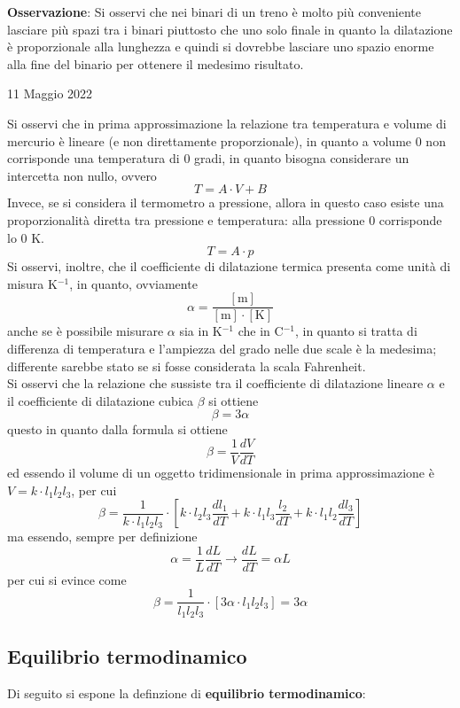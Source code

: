 \documentclass[a4paper]{extarticle}
\begin{document}
\vspace{1em}
\noindent
\textbf{Osservazione}: Si osservi che nei binari di un treno è molto più conveniente lasciare più spazi tra i binari piuttosto che uno solo finale in quanto la dilatazione è proporzionale alla lunghezza e quindi si dovrebbe lasciare uno spazio enorme alla fine del binario per ottenere il medesimo risultato.

\newpage
\noindent
\begin{center}
  11 Maggio 2022
\end{center}
Si osservi che in prima approssimazione la relazione tra temperatura e volume di mercurio è lineare (e non direttamente proporzionale), in quanto a volume $0$ non corrisponde una temperatura di $0$ gradi, in quanto bisogna considerare un intercetta non nullo, ovvero
\[T=A \cdot V + B\]
Invece, se si considera il termometro a pressione, allora in questo caso esiste una proporzionalità diretta tra pressione e temperatura: alla pressione $0$ corrisponde lo $0$ K.
\[T=A \cdot p\]
Si osservi, inoltre, che il coefficiente di dilatazione termica presenta come unità di misura K$^{-1}$, in quanto, ovviamente
\[\alpha = \frac{[\text{m}]}{[\text{m}] \cdot [\text{K}]}\]
anche se è possibile misurare $\alpha$ sia in K$^{-1}$ che in C$^{-1}$, in quanto si tratta di differenza di temperatura e l'ampiezza del grado nelle due scale è la medesima; differente sarebbe stato se si fosse considerata la scala Fahrenheit.\\
Si osservi che la relazione che sussiste tra il coefficiente di dilatazione lineare $\alpha$ e il coefficiente di dilatazione cubica $\beta$ si ottiene
\[\boxed{\beta=3 \alpha}\]
questo in quanto dalla formula si ottiene
\[\beta = \frac{1}{V} \frac{dV}{dT}\]
ed essendo il volume di un oggetto tridimensionale in prima approssimazione è $V=k \cdot l_1 l_2 l_3$, per cui
\[\beta=\frac{1}{k \cdot l_1 l_2 l_3} \cdot \left[k \cdot l_2 l_3 \frac{dl_1}{dT} + k \cdot l_1 l_3 \frac{l_2}{dT} + k \cdot l_1 l_2 \frac{dl_3}{dT}\right]\]
ma essendo, sempre per definizione
\[\alpha=\frac{1}{L} \frac{dL}{dT} \longrightarrow \frac{dL}{dT} = \alpha L\]
per cui si evince come
\[\beta=\frac{1}{l_1 l_2 l_3} \cdot \left[3 \alpha \cdot l_1 l_2 l_3\right] = 3 \alpha\]

\vspace{1em}
\subsection{Equilibrio termodinamico}
Di seguito si espone la definzione di \textbf{equilibrio termodinamico}:
\end{document}

